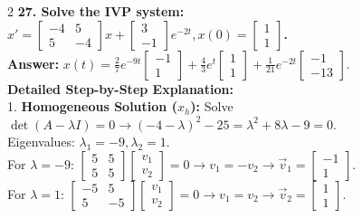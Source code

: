 \documentclass[4pt]{extarticle}
\begin{document}
\begin{multicols}{2}
\textbf{27. Solve the IVP system: $x' = \begin{bmatrix} -4 & 5 \\ 5 & -4 \end{bmatrix}x + \begin{bmatrix} 3 \\ -1 \end{bmatrix}e^{-2t}, x(0) = \begin{bmatrix} 1 \\ 1 \end{bmatrix}$.} \\
\textbf{Answer:} $x(t) = \frac{2}{7}e^{-9t}\begin{bmatrix} -1 \\ 1 \end{bmatrix} + \frac{4}{3}e^t\begin{bmatrix} 1 \\ 1 \end{bmatrix} + \frac{1}{21}e^{-2t}\begin{bmatrix} -1 \\ -13 \end{bmatrix}$. \\
\textbf{Detailed Step-by-Step Explanation:} \\
1. \textbf{Homogeneous Solution ($x_h$):} Solve $\det(A-\lambda I) = 0 \rightarrow (-4-\lambda)^2 - 25 = \lambda^2+8\lambda-9=0$. \\
Eigenvalues: $\lambda_1 = -9, \lambda_2 = 1$. \\
For $\lambda = -9$: $\begin{bmatrix} 5 & 5 \\ 5 & 5 \end{bmatrix} \begin{bmatrix} v_1 \\ v_2 \end{bmatrix} = 0 \rightarrow v_1 = -v_2 \rightarrow \vec{v}_1 = \begin{bmatrix} -1 \\ 1 \end{bmatrix}$. \\
For $\lambda = 1$: $\begin{bmatrix} -5 & 5 \\ 5 & -5 \end{bmatrix} \begin{bmatrix} v_1 \\ v_2 \end{bmatrix} = 0 \rightarrow v_1 = v_2 \rightarrow \vec{v}_2 = \begin{bmatrix} 1 \\ 1 \end{bmatrix}$. \\

\end{multicols}
\end{document}
